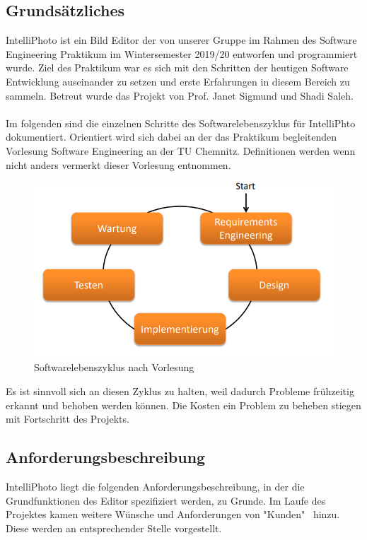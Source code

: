 \documentclass[11pt,a4paper]{article}
\begin{document}
\subsection{Grundsätzliches}
IntelliPhoto ist ein Bild Editor der von unserer Gruppe im Rahmen des Software Engineering Praktikum im Wintersemester 2019/20 entworfen und programmiert wurde. Ziel des Praktikum war es sich mit den Schritten der heutigen Software Entwicklung auseinander zu setzen und erste Erfahrungen in diesem Bereich zu sammeln. Betreut wurde das Projekt von Prof. Janet Sigmund und Shadi Saleh.\\
\\
Im folgenden sind die einzelnen Schritte des Softwarelebenszyklus für IntelliPhto dokumentiert.
Orientiert wird sich dabei an der das Praktikum begleitenden Vorlesung Software Engineering an der TU Chemnitz. Definitionen werden wenn nicht anders vermerkt dieser Vorlesung entnommen.
\begin{figure}[H]
  \centering
  \includegraphics[width=\textwidth,frame]{Softwarezyklus.png}
	\caption{Softwarelebenszyklus nach Vorlesung}
	\label{fig1}
\end{figure}
\noindent
Es ist sinnvoll sich an diesen Zyklus zu halten, weil dadurch Probleme frühzeitig erkannt und behoben werden können. Die Kosten ein Problem zu beheben stiegen mit Fortschritt des Projekts.

\subsection{Anforderungsbeschreibung}
IntelliPhoto liegt die folgenden Anforderungsbeschreibung, in der die Grundfunktionen des Editor spezifiziert werden, zu Grunde. Im Laufe des Projektes kamen weitere Wünsche und Anforderungen von "Kunden" \, hinzu. Diese werden an entsprechender Stelle vorgestellt.\\ 
\end{document}
